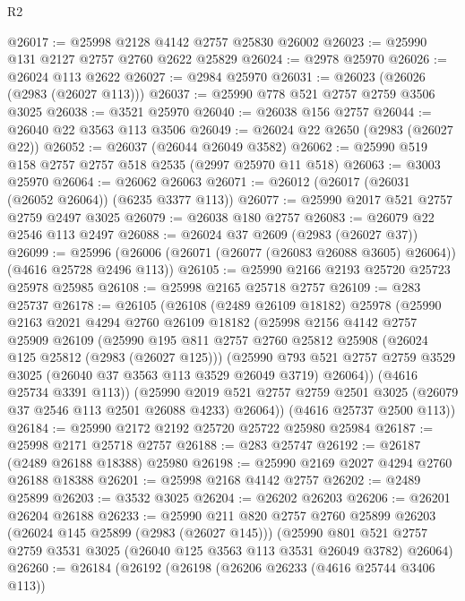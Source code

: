 \begin{lexlean}{R2}
\begin{coremodule}
@26017 := @25998 @2128 @4142 @2757 @25830 @26002
@26023 := @25990 @131 @2127 @2757 @2760 @2622 @25829
@26024 := @2978 @25970
@26026 := @26024 @113 @2622
@26027 := @2984 @25970
@26031 := @26023 (@26026 (@2983 (@26027 @113)))
@26037 := @25990 @778 @521 @2757 @2759 @3506 @3025
@26038 := @3521 @25970
@26040 := @26038 @156 @2757
@26044 := @26040 @22 @3563 @113 @3506
@26049 := @26024 @22 @2650 (@2983 (@26027 @22))
@26052 := @26037 (@26044 @26049 @3582)
@26062 := @25990 @519 @158 @2757 @2757 @518 @2535 (@2997 @25970 @11 @518)
@26063 := @3003 @25970
@26064 := @26062 @26063
@26071 := @26012 (@26017 (@26031 (@26052 @26064)) (@6235 @3377 @113))
@26077 := @25990 @2017 @521 @2757 @2759 @2497 @3025
@26079 := @26038 @180 @2757
@26083 := @26079 @22 @2546 @113 @2497
@26088 := @26024 @37 @2609 (@2983 (@26027 @37))
@26099 := @25996 (@26006 (@26071 (@26077 (@26083 @26088 @3605) @26064)) (@4616 @25728 @2496 @113))
@26105 := @25990 @2166 @2193 @25720 @25723 @25978 @25985
@26108 := @25998 @2165 @25718 @2757
@26109 := @283 @25737
@26178 := @26105
    (@26108
      (@2489 @26109 @18182)
      @25978
      (@25990
        @2163
        @2021
        @4294
        @2760
        @26109
        @18182
        (@25998
          @2156
          @4142
          @2757
          @25909
          @26109
          (@25990
            @195
            @811
            @2757
            @2760
            @25812
            @25908
            (@26024 @125 @25812 (@2983 (@26027 @125)))
            (@25990
              @793
              @521
              @2757
              @2759
              @3529
              @3025
              (@26040 @37 @3563 @113 @3529 @26049 @3719)
              @26064))
          (@4616 @25734 @3391 @113))
        (@25990
          @2019
          @521
          @2757
          @2759
          @2501
          @3025
          (@26079 @37 @2546 @113 @2501 @26088 @4233)
          @26064))
      (@4616 @25737 @2500 @113))
@26184 := @25990 @2172 @2192 @25720 @25722 @25980 @25984
@26187 := @25998 @2171 @25718 @2757
@26188 := @283 @25747
@26192 := @26187 (@2489 @26188 @18388) @25980
@26198 := @25990 @2169 @2027 @4294 @2760 @26188 @18388
@26201 := @25998 @2168 @4142 @2757
@26202 := @2489 @25899
@26203 := @3532 @3025
@26204 := @26202 @26203
@26206 := @26201 @26204 @26188
@26233 := @25990
    @211
    @820
    @2757
    @2760
    @25899
    @26203
    (@26024 @145 @25899 (@2983 (@26027 @145)))
    (@25990 @801 @521 @2757 @2759 @3531 @3025 (@26040 @125 @3563 @113 @3531 @26049 @3782) @26064)
@26260 := @26184
    (@26192
      (@26198
        (@26206 @26233 (@4616 @25744 @3406 @113))

\end{coremodule}
\end{lexlean}
